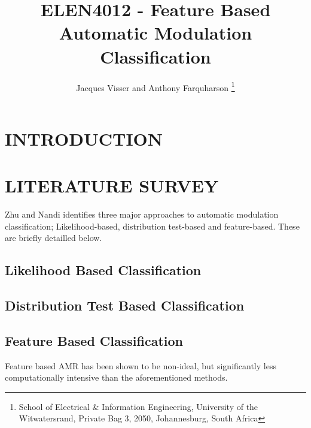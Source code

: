 \documentclass[10pt,twocolumn]{witseiepaper}
\begin{document}
\title{ELEN4012 - Feature Based Automatic Modulation Classification}

\author{Jacques Visser and Anthony Farquharson
\thanks{School of Electrical \& Information Engineering, University of the
Witwatersrand, Private Bag 3, 2050, Johannesburg, South Africa}
}



\maketitle
\thispagestyle{empty}\pagestyle{empty}

\section{INTRODUCTION}

\section{LITERATURE SURVEY}
Zhu and Nandi \cite{zhu2014automatic} identifies three major approaches to automatic modulation classification; Likelihood-based, distribution test-based and feature-based. These are briefly detailled below.
	\subsection{Likelihood Based Classification}
	\subsection{Distribution Test Based Classification}
	\subsection{Feature Based Classification}
	Feature based AMR has been shown to be non-ideal, but significantly less computationally intensive \cite{zhu2014automatic} than the aforementioned methods.
\end{document}
